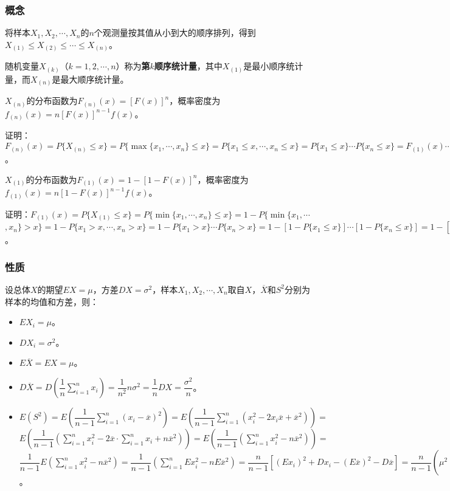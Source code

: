 \subsubsection{概念}

将样本$X_1,X_2,\cdots,X_n$的$n$个观测量按其值从小到大的顺序排列，得到$X_{(1)}\leqslant X_{(2)}\leqslant\cdots\leqslant X_{(n)}$。

随机变量$X_{(k)}$（$k=1,2,\cdots,n$）称为\textbf{第$k$顺序统计量}，其中$X_{(1)}$是最小顺序统计量，而$X_{(n)}$是最大顺序统计量。

$X_{(n)}$的分布函数为$F_{(n)}(x)=[F(x)]^n$，概率密度为$f_{(n)}(x)=n[F(x)]^{n-1}f(x)$。

证明：$F_{(n)}(x)=P\{X_{(n)}\leqslant x\}=P\{\max\{x_1,\cdots,x_n\}\leqslant x\}=P\{x_1\leqslant x,\cdots,x_n\leqslant x\}=P\{x_1\leqslant x\}\cdots P\{x_n\leqslant x\}=F_{(1)}(x)\cdots F_{(n)}(x)=[F(x)]^n$。

$X_{(1)}$的分布函数为$F_{(1)}(x)=1-[1-F(x)]^n$，概率密度为$f_{(1)}(x)=n[1-F(x)]^{n-1}f(x)$。

证明：$F_{(1)}(x)=P\{X_{(1)}\leqslant x\}=P\{\min\{x_1,\cdots,x_n\}\leqslant x\}=1-P\{\min\{x_1,\cdots$\\$,x_n\}>x\}=1-P\{x_1>x,\cdots,x_n>x\}=1-P\{x_1>x\}\cdots P\{x_n>x\}=1-[1-P\{x_1\leqslant x\}]\cdots[1-P\{x_n\leqslant x\}]=1-[1-F_{(1)}(x)]\cdots[1-F_{(n)}(x)]=1-[1-F(x)]^n$。

\subsubsection{性质}

设总体$X$的期望$EX=\mu$，方差$DX=\sigma^2$，样本$X_1,X_2,\cdots,X_n$取自$X$，$\overline{X}$和$S^2$分别为样本的均值和方差，则：

\begin{itemize}
    \item $EX_i=\mu$。
    \item $DX_i=\sigma^2$。
    \item $E\overline{X}=EX=\mu$。
    \item $D\overline{X}=D\left(\dfrac{1}{n}\sum\limits_{i=1}^nx_i\right)=\dfrac{1}{n^2}n\sigma^2=\dfrac{1}{n}DX=\dfrac{\sigma^2}{n}$。
    \item $E(S^2)=E\left(\dfrac{1}{n-1}\sum\limits_{i=1}^n(x_i-\overline{x})^2\right)=E\left(\dfrac{1}{n-1}\sum\limits_{i=1}^n(x_i^2-2x_i\overline{x}+\overline{x}^2)\right)=$\\$E\left(\dfrac{1}{n-1}\left(\sum\limits_{i=1}^nx_i^2-2\overline{x}\cdot\sum\limits_{i=1}^nx_i+n\overline{x}^2\right)\right)=E\left(\dfrac{1}{n-1}\left(\sum\limits_{i=1}^nx_i^2-n\overline{x}^2\right)\right)=$\\$\dfrac{1}{n-1}E\left(\sum\limits_{i=1}^nx_i^2-n\overline{x}^2\right)=\dfrac{1}{n-1}\left(\sum\limits_{i=1}^nEx_i^2-nE\overline{x}^2\right)=\dfrac{n}{n-1}[(Ex_i)^2+Dx_i-(E\overline{x})^2-D\overline{x}]=\dfrac{n}{n-1}\left(\mu^2+\sigma^2-\mu^2-\dfrac{\sigma^2}{n}\right)=DX=\sigma^2$。
\end{itemize}

